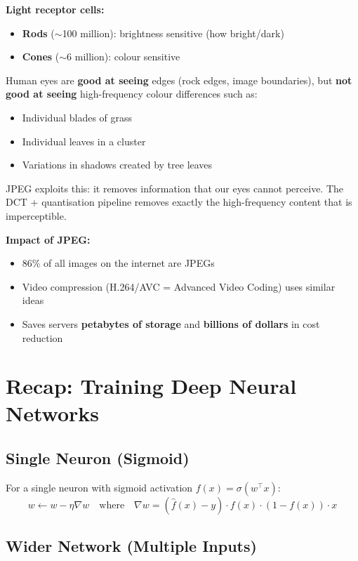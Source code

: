 \documentclass[12pt,a4paper]{article}
\begin{document}
\textbf{Light receptor cells:}
\begin{itemize}
  \item \textbf{Rods} ($\sim$100 million): brightness sensitive (how bright/dark)
  \item \textbf{Cones} ($\sim$6 million): colour sensitive
\end{itemize}

Human eyes are \textbf{good at seeing} edges (rock edges, image boundaries), but \textbf{not good at seeing} high-frequency colour differences such as:
\begin{itemize}
  \item Individual blades of grass
  \item Individual leaves in a cluster
  \item Variations in shadows created by tree leaves
\end{itemize}

JPEG exploits this: it removes information that our eyes cannot perceive. The DCT + quantisation pipeline removes exactly the high-frequency content that is imperceptible.

\textbf{Impact of JPEG:}
\begin{itemize}
  \item 86\% of all images on the internet are JPEGs
  \item Video compression (H.264/AVC = Advanced Video Coding) uses similar ideas
  \item Saves servers \textbf{petabytes of storage} and \textbf{billions of dollars} in cost reduction
\end{itemize}

\section{Recap: Training Deep Neural Networks}

\subsection{Single Neuron (Sigmoid)}

For a single neuron with sigmoid activation $f(x) = \sigma(w^\top x)$:
\[
w \leftarrow w - \eta\nabla w
\quad\text{where}\quad
\nabla w = (\hat{f}(x) - y)\cdot f(x)\cdot(1-f(x))\cdot x
\]

\subsection{Wider Network (Multiple Inputs)}
\end{document}
